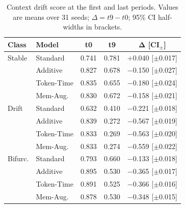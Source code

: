 \documentclass[runningheads]{llncs}
\begin{document}
\begin{table}[t]
\caption{Context drift score at the first and last periods. Values are means
over 31 seeds; \(\Delta=t9-t0\); 95\% CI half-widths in brackets.}
\label{tab:context-drift}
\centering
\scriptsize
\renewcommand{\arraystretch}{0.88}
\setlength{\tabcolsep}{4pt}
\begin{tabular}{llccc}
\toprule
\textbf{Class} & \textbf{Model} & \textbf{t0} & \textbf{t9} & \(\boldsymbol{\Delta}\) [CI\(_{\pm}\)] \\
\midrule
Stable & Standard & 0.741 & 0.781 & $+$0.040 [$\pm$0.017] \\
       & Additive & 0.827 & 0.678 & $-$0.150 [$\pm$0.027] \\
       & Token-Time    & 0.835 & 0.655 & $-$0.180 [$\pm$0.024] \\
       & Mem-Aug. & 0.830 & 0.672 & $-$0.158 [$\pm$0.021] \\
\midrule
Drift  & Standard & 0.632 & 0.410 & $-$0.221 [$\pm$0.018] \\
       & Additive & 0.839 & 0.272 & $-$0.567 [$\pm$0.019] \\
       & Token-Time    & 0.833 & 0.269 & $-$0.563 [$\pm$0.020] \\
       & Mem-Aug. & 0.833 & 0.274 & $-$0.559 [$\pm$0.022] \\
\midrule
Bifurc. & Standard & 0.793 & 0.660 & $-$0.133 [$\pm$0.018] \\
        & Additive & 0.895 & 0.530 & $-$0.365 [$\pm$0.017] \\
        & Token-Time    & 0.891 & 0.525 & $-$0.366 [$\pm$0.016] \\
        & Mem-Aug. & 0.878 & 0.530 & $-$0.348 [$\pm$0.015] \\
\bottomrule
\end{tabular}
\end{table}
\end{document}
